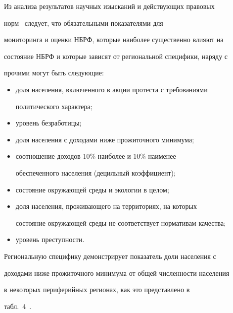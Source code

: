     Из анализа результатов научных изысканий и действующих правовых


норм~\cite{8-luc} следует, что обязательными показателями для


мониторинга и оценки НБРФ, которые наиболее существенно влияют на


состояние НБРФ и которые зависят от региональной специфики, наряду с


прочими могут быть следующие:


    \begin{itemize}


\item доля населения, включенного в акции протеста с требованиями


политического характера;\\[-14pt]


\item уровень безработицы;\\[-14pt]


\item доля населения с доходами ниже прожиточного минимума;\\[-14pt]


\item соотношение доходов 10\% наиболее и 10\% наименее


обеспеченного населения (децильный коэффициент);\\[-14pt]


\item состояние окружающей среды и экологии в целом;\\[-14pt]


\item доля населения, проживающего на территориях, на которых


состояние окружающей среды не соответствует нормативам качества;\\[-14pt]


\item уровень преступности.


\end{itemize}





    Региональную специфику демонстрирует показатель доли населения с


доходами ниже прожиточного минимума от общей численности населения


в некоторых периферийных регионах, как это представлено в


табл.~4~\cite{6-luc}.





